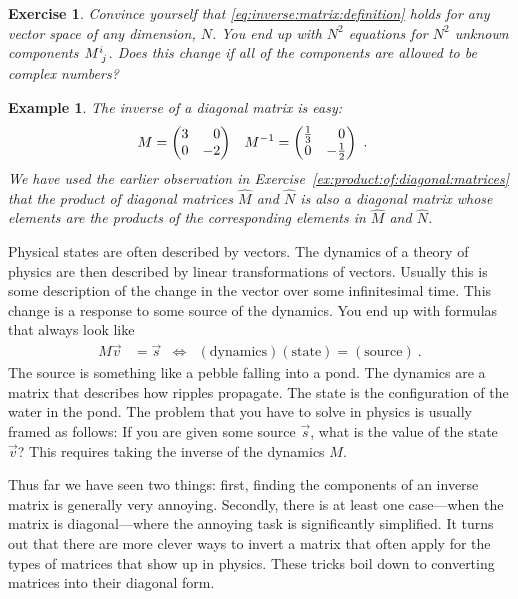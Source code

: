 \documentclass[12pt]{article}
\newtheorem{exercise}{Exercise}[section]
\newtheorem{example}{Example}[section]
\begin{document}
\begin{exercise}
Convince yourself that \eqref{eq:inverse:matrix:definition} holds for \emph{any} vector space of any dimension, $N$. You end up with $N^2$ equations for $N^2$ unknown components $M\aij{i}{j}$. Does this change if all of the components are allowed to be complex numbers?
\end{exercise}

\begin{example}
The inverse of a diagonal matrix is easy:
\begin{align}
    M &=
    \begin{pmatrix}
     3 & \pp  0 \\
     0 & -2
    \end{pmatrix}
    &
    M^{-1} &=
    \begin{pmatrix}
    \frac{1}{3} & \pp 0 \\
    0 & -\frac{1}{2}
    \end{pmatrix} \ .
\end{align}
We have used the earlier observation in Exercise~\ref{ex:product:of:diagonal:matrices} that the product of diagonal matrices $\hat M$ and $\hat N$ is also a diagonal matrix whose elements are the products of the corresponding elements in $\hat M$ and $\hat N$.
\end{example}

Physical states are often described by vectors. The dynamics of a theory of physics are then described by linear transformations of vectors. Usually this is some description of the change in the vector over some infinitesimal time. This change is a response to some source of the dynamics. You end up with formulas that always look like
\begin{align}
    M \vec{v} &= \vec{s} 
    &
    \Leftrightarrow
    &
    (\text{dynamics})(\text{state}) = (\text{source}) \ .
\end{align}
The source is something like a pebble falling into a pond. The dynamics are a matrix that describes how ripples propagate. The state is the configuration of the water in the pond.
%
The problem that you have to solve in physics is usually framed as follows: If you are given some source $\vec{s}$, what is the value of the state $\vec{v}$? This requires taking the inverse of the dynamics $M$. 

Thus far we have seen two things: first, finding the components of an inverse matrix is generally very annoying. Secondly, there is at least one case---when the matrix is diagonal---where the annoying task is significantly simplified. It turns out that there are more clever ways to invert a matrix that often apply for the types of matrices that show up in physics. These tricks boil down to converting matrices into their diagonal form.
\end{document}
